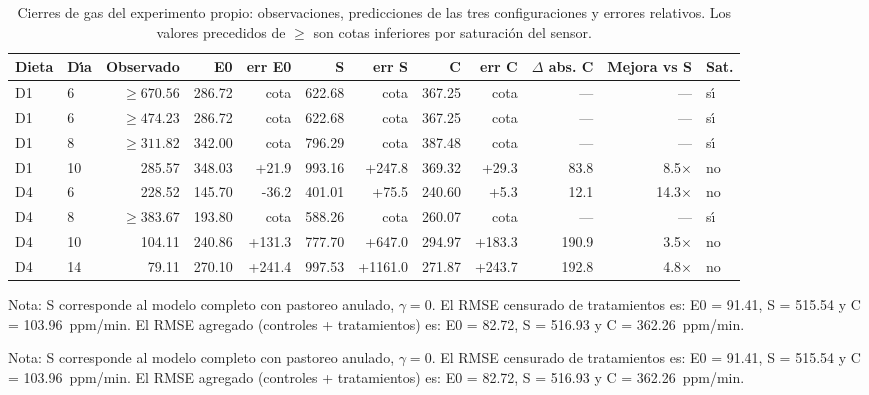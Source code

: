 \begin{table}[htbp]
  \centering
  \footnotesize
  \setlength{\tabcolsep}{2.5pt}
  \caption{Cierres de gas del experimento propio: observaciones, predicciones de las tres configuraciones y errores relativos. Los valores precedidos de $\geq$ son cotas inferiores por saturaci\'{o}n del sensor.}
  \label{tab:cierres}
  \begin{tabular}{llrrrrrrrrrl}
    \toprule
    Dieta & D\'{\i}a & Observado & E0 & err E0 & S & err S & C & err C & $\Delta$ abs. C & Mejora vs S & Sat. \\
    \midrule
    D1 & 6  & $\geq 670.56$ & 286.72 & cota & 622.68  & cota & 367.25  & cota & --- & --- & s\'{\i} \\
    D1 & 6  & $\geq 474.23$ & 286.72 & cota & 622.68  & cota & 367.25  & cota & --- & --- & s\'{\i} \\
    D1 & 8  & $\geq 311.82$ & 342.00 & cota & 796.29  & cota & 387.48  & cota & --- & --- & s\'{\i} \\
    D1 & 10 & 285.57        & 348.03 & +21.9 & 993.16  & +247.8 & 369.32  & +29.3 & 83.8 & 8.5$\times$ & no \\
    D4 & 6  & 228.52        & 145.70 & -36.2 & 401.01  & +75.5 & 240.60  & +5.3 & 12.1 & 14.3$\times$ & no \\
    D4 & 8  & $\geq 383.67$ & 193.80 & cota & 588.26  & cota & 260.07  & cota & --- & --- & s\'{\i} \\
    D4 & 10 & 104.11        & 240.86 & +131.3 & 777.70  & +647.0 & 294.97  & +183.3 & 190.9 & 3.5$\times$ & no \\
    D4 & 14 & 79.11         & 270.10 & +241.4 & 997.53  & +1161.0 & 271.87 & +243.7 & 192.8 & 4.8$\times$ & no \\
    \bottomrule
  \end{tabular}
\end{table}

\noindent \footnotesize Nota: S corresponde al modelo completo con pastoreo anulado,
$\gamma = 0$. El RMSE censurado de tratamientos es: E0 = 91.41, S = 515.54 y C =
103.96~ppm/min. El RMSE agregado (controles + tratamientos) es: E0 = 82.72, S = 516.93 y C = 362.26~ppm/min.\par

\noindent \footnotesize Nota: S corresponde al modelo completo con pastoreo anulado,
$\gamma = 0$. El RMSE censurado de tratamientos es: E0 = 91.41, S = 515.54 y C =
103.96~ppm/min. El RMSE agregado (controles + tratamientos) es: E0 = 82.72, S = 516.93 y C = 362.26~ppm/min.\par
